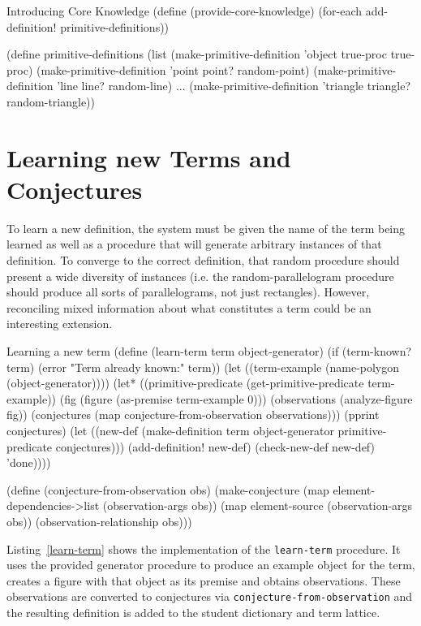 \begin{code-listing}
[label=core-knowledge]
{Introducing Core Knowledge}
(define (provide-core-knowledge)
  (for-each add-definition! primitive-definitions))

(define primitive-definitions
  (list
   (make-primitive-definition 'object true-proc true-proc)
   (make-primitive-definition 'point point? random-point)
   (make-primitive-definition 'line line? random-line)
   ...
   (make-primitive-definition 'triangle triangle? random-triangle))
\end{code-listing}

\section{Learning new Terms and Conjectures}

To learn a new definition, the system must be given the name of the
term being learned as well as a procedure that will generate arbitrary
instances of that definition. To converge to the correct definition,
that random procedure should present a wide diversity of instances
(i.e. the random-parallelogram procedure should produce all sorts of
parallelograms, not just rectangles). However, reconciling mixed
information about what constitutes a term could be an interesting
extension.

\begin{code-listing}
[label=learn-term]
{Learning a new term}
(define (learn-term term object-generator)
  (if (term-known? term) (error "Term already known:" term))
  (let ((term-example (name-polygon (object-generator))))
    (let* ((primitive-predicate (get-primitive-predicate term-example))
           (fig (figure (as-premise term-example 0)))
           (observations (analyze-figure fig))
           (conjectures (map conjecture-from-observation observations)))
      (pprint conjectures)
      (let ((new-def
             (make-definition term object-generator
                primitive-predicate conjectures)))
        (add-definition! new-def)
        (check-new-def new-def)
        'done))))

(define (conjecture-from-observation obs)
  (make-conjecture
   (map element-dependencies->list (observation-args obs))
   (map element-source (observation-args obs))
   (observation-relationship obs)))
\end{code-listing}

Listing~\ref{learn-term} shows the implementation of the
\texttt{learn-term} procedure. It uses the provided generator
procedure to produce an example object for the term, creates a figure
with that object as its premise and obtains observations. These
observations are converted to conjectures via
\texttt{conjecture-from-observation} and the resulting definition is
added to the student dictionary and term lattice.

